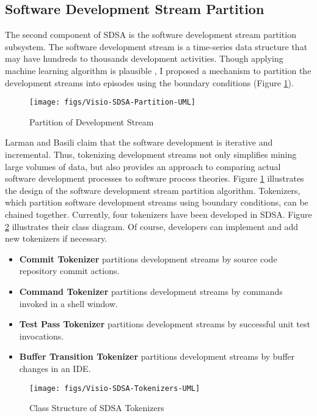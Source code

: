 \subsection{Software Development Stream Partition}
\label{sec:SDSA-Partition}
The second component of SDSA is the software development stream 
partition subsystem. 
The software development stream is a time-series data structure
that may have hundreds to thousands development activities. Though
applying machine learning algorithm is plausible \cite{Cook:95}, 
I proposed a mechanism to partition the development streams into 
episodes using the boundary conditions (Figure \ref{fig:SDSA-Partition}).
\begin{figure}[htbp]
  \centering
  \texttt{[image: figs/Visio-SDSA-Partition-UML]}
  \caption{Partition of Development Stream}
  \label{fig:SDSA-Partition}
\end{figure}

Larman and Basili\cite{Larman:03} claim that the software development 
is iterative and incremental. Thus, tokenizing development streams not 
only simplifies mining large volumes of data, but also provides an approach 
to comparing actual software development processes to software process 
theories. Figure \ref{fig:SDSA-Partition} illustrates 
the design of the software development stream partition algorithm. 
Tokenizers, which partition software development streams using 
boundary conditions, can be chained together. Currently, four tokenizers 
have been developed in SDSA. Figure \ref{fig:SDSA-Tokenizers} illustrates 
their class diagram. Of course, developers can implement and add 
new tokenizers if necessary. 
\begin{itemize}
\item {\textbf{Commit Tokenizer}} partitions development streams by
source code repository commit actions.  

\item {\textbf{Command Tokenizer}} partitions development streams by
commands invoked in a shell window. 

\item {\textbf{Test Pass Tokenizer}} partitions development streams
by successful unit test invocations. 

\item {\textbf{Buffer Transition Tokenizer}} partitions development
streams by buffer changes in an IDE. 
\end{itemize}
\begin{figure}[htbp]
  \centering
  \texttt{[image: figs/Visio-SDSA-Tokenizers-UML]}
  \caption{Class Structure of SDSA Tokenizers}
  \label{fig:SDSA-Tokenizers}
\end{figure}


